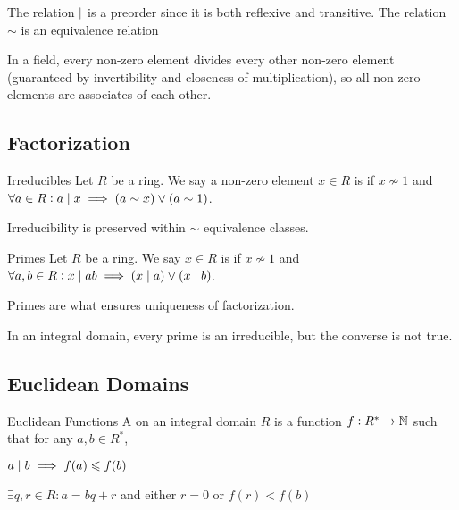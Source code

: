 \documentclass{styles/tufte}
\begin{document}
The relation $\mid$ is a preorder since it is both reflexive and transitive. The relation $\sim$ is an equivalence relation

In a field, every non-zero element divides every other non-zero element (guaranteed by invertibility and closeness of multiplication), so all non-zero elements are associates of each other.


\subsection{Factorization}
  
  \begin{definition}{Irreducibles}{}
    Let $R$ be a ring. We say a non-zero element $x \in R$ is  if $x \not\sim 1$ and $\forall a \in R: a \mid x \implies (a \sim x) \lor (a \sim 1)$. 
  \end{definition}
  
  Irreducibility is preserved within $\sim$ equivalence classes.
  
  \begin{definition}{Primes}{}
    Let $R$ be a ring. We say $x \in R$ is  if $x \not\sim 1$ and $\forall a, b \in R: x \mid ab \implies (x \mid a) \lor (x \mid b)$.
  \end{definition}
  

  Primes are what ensures uniqueness of factorization.
  
  In an integral domain, every prime is an irreducible, but the converse is not true.
  

\subsection{Euclidean Domains}
  
  \begin{definition}{Euclidean Functions}{}
    A  on an integral domain $R$ is a function $f: R^* \to \mathbb{N}$ such that for any $a, b \in R^*$,
    \begin{romanenum}
      \item $a \mid b \implies f(a) \leqslant f(b)$
      \item $\exists q, r \in R: a = bq + r$ and either $r = 0$ or $f(r) < f(b)$
    \end{romanenum}
  \end{definition}
  
\end{document}
